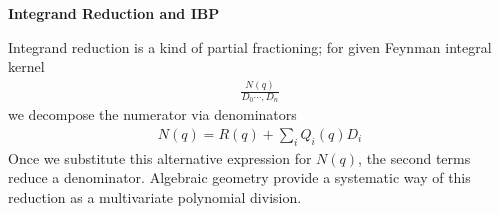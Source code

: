 \documentclass[10pt]{article}
\begin{document}
\textbf{Integrand Reduction and IBP}

Integrand reduction is a kind of partial fractioning; for given Feynman integral kernel
\begin{eqnarray}
\nonumber
\frac{N(q)}{D_0 \cdots, D_n}
\end{eqnarray}
we decompose the numerator via denominators
\begin{eqnarray}
\nonumber
N(q) = R(q) + \sum_i Q_i(q) D_i
\end{eqnarray}
Once we substitute this alternative expression for $N(q)$, the second terms reduce a denominator.
Algebraic geometry provide a systematic way of this reduction as a multivariate polynomial division.
\end{document}

